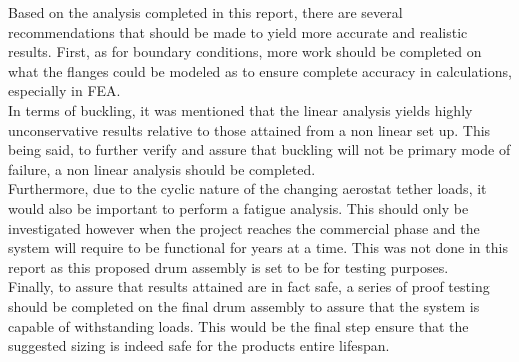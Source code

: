 
Based on the analysis completed in this report, there are several recommendations that should be made to yield more accurate and realistic results. First, as for boundary conditions, more work should be completed on what the flanges could be modeled as to ensure complete accuracy in calculations, especially in FEA.\\

In terms of buckling, it was mentioned that the linear analysis yields highly unconservative results relative to those attained from a non linear set up. This being said, to further verify and assure that buckling will not be primary mode of failure, a non linear analysis should be completed.\\

Furthermore, due to the cyclic nature of the changing aerostat tether loads, it would also be important to perform a fatigue analysis. This should only be investigated however when the project reaches the commercial phase and the system will require to be functional for years at a time. This was not done in this report as this proposed drum assembly is set to be for testing purposes.\\

Finally, to assure that results attained are in fact safe, a series of proof testing should be completed on the final drum assembly to assure that the system is capable of withstanding loads. This would be the final step ensure that the suggested sizing is indeed safe for the products entire lifespan.\\
